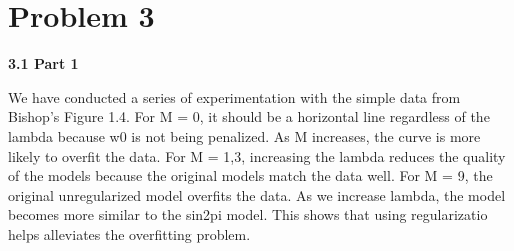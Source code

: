 \section{Problem 3}

{\bfseries 3.1 Part 1}

We have conducted a series of experimentation with the simple data from Bishop's Figure 1.4. For M = 0, it should be a horizontal line regardless of the lambda because w0 is not being penalized.  As M increases, the curve is more likely to overfit the data. For M = 1,3, increasing the lambda reduces the quality of the models because the original models  match the data well. For M = 9, the original unregularized model overfits the data. As we increase lambda, the model becomes more similar to the sin2pi model. This shows that using regularizatio helps alleviates the overfitting problem. 

